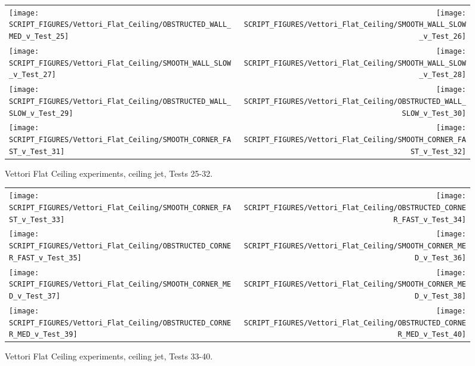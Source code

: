 \begin{figure}[p]
\begin{tabular*}{\textwidth}{l@{\extracolsep{\fill}}r}
\texttt{[image: SCRIPT\_FIGURES/Vettori\_Flat\_Ceiling/OBSTRUCTED\_WALL\_MED\_v\_Test\_25]} &
\texttt{[image: SCRIPT\_FIGURES/Vettori\_Flat\_Ceiling/SMOOTH\_WALL\_SLOW\_v\_Test\_26]} \\
\texttt{[image: SCRIPT\_FIGURES/Vettori\_Flat\_Ceiling/SMOOTH\_WALL\_SLOW\_v\_Test\_27]} &
\texttt{[image: SCRIPT\_FIGURES/Vettori\_Flat\_Ceiling/SMOOTH\_WALL\_SLOW\_v\_Test\_28]} \\
\texttt{[image: SCRIPT\_FIGURES/Vettori\_Flat\_Ceiling/OBSTRUCTED\_WALL\_SLOW\_v\_Test\_29]} &
\texttt{[image: SCRIPT\_FIGURES/Vettori\_Flat\_Ceiling/OBSTRUCTED\_WALL\_SLOW\_v\_Test\_30]} \\
\texttt{[image: SCRIPT\_FIGURES/Vettori\_Flat\_Ceiling/SMOOTH\_CORNER\_FAST\_v\_Test\_31]} &
\texttt{[image: SCRIPT\_FIGURES/Vettori\_Flat\_Ceiling/SMOOTH\_CORNER\_FAST\_v\_Test\_32]} \\
\end{tabular*}
\caption[Vettori Flat Ceiling experiments, ceiling jet, Tests 25-32]{Vettori Flat Ceiling experiments, ceiling jet, Tests 25-32.}
\label{Vettori_4}
\end{figure}

\begin{figure}[p]
\begin{tabular*}{\textwidth}{l@{\extracolsep{\fill}}r}
\texttt{[image: SCRIPT\_FIGURES/Vettori\_Flat\_Ceiling/SMOOTH\_CORNER\_FAST\_v\_Test\_33]} &
\texttt{[image: SCRIPT\_FIGURES/Vettori\_Flat\_Ceiling/OBSTRUCTED\_CORNER\_FAST\_v\_Test\_34]} \\
\texttt{[image: SCRIPT\_FIGURES/Vettori\_Flat\_Ceiling/OBSTRUCTED\_CORNER\_FAST\_v\_Test\_35]} &
\texttt{[image: SCRIPT\_FIGURES/Vettori\_Flat\_Ceiling/SMOOTH\_CORNER\_MED\_v\_Test\_36]} \\
\texttt{[image: SCRIPT\_FIGURES/Vettori\_Flat\_Ceiling/SMOOTH\_CORNER\_MED\_v\_Test\_37]} &
\texttt{[image: SCRIPT\_FIGURES/Vettori\_Flat\_Ceiling/SMOOTH\_CORNER\_MED\_v\_Test\_38]} \\
\texttt{[image: SCRIPT\_FIGURES/Vettori\_Flat\_Ceiling/OBSTRUCTED\_CORNER\_MED\_v\_Test\_39]} &
\texttt{[image: SCRIPT\_FIGURES/Vettori\_Flat\_Ceiling/OBSTRUCTED\_CORNER\_MED\_v\_Test\_40]} \\
\end{tabular*}
\caption[Vettori Flat Ceiling experiments, ceiling jet, Tests 33-40]{Vettori Flat Ceiling experiments, ceiling jet, Tests 33-40.}
\label{Vettori_5}
\end{figure}

